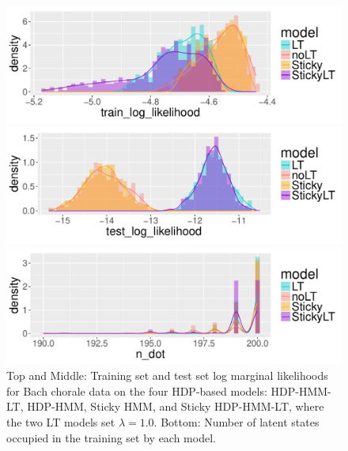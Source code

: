 \begin{figure}[tb]
\begin{center}
  \centerline{\includegraphics[width = 0.75\columnwidth]{fig/music/bach/lambda1/train_log_likelihood_density.pdf}}
  \centerline{\includegraphics[width = 0.75\columnwidth]{fig/music/bach/lambda1/test_log_likelihood_density.pdf}}
  \centerline{\includegraphics[width = 0.75\columnwidth]{fig/music/bach/lambda1/n_dot_density.pdf}}
\caption{Top and Middle: Training set and test set log marginal likelihoods for Bach
  chorale data on the four HDP-based models: HDP-HMM-LT, HDP-HMM,
  Sticky HMM, and Sticky HDP-HMM-LT, where the two LT models set
  $\lambda = 1.0$.  Bottom: Number of latent states
  occupied in the training set by each model. \label{fig:bach-hyperparameter-lambda1p0}
}
\end{center}
\end{figure}

